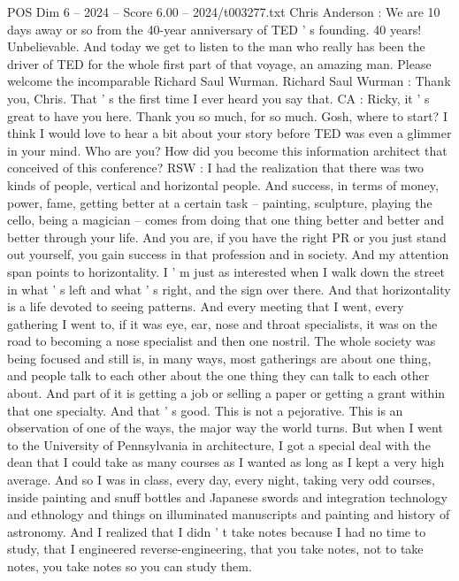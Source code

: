 \begin{textsample}{POS Dim 6 – 2024 – Score 6.00 – 2024/t003277.txt}  \label{ex:f6_pos_073}
Chris Anderson : We are 10 days away or so from the 40-year anniversary of TED ' s founding. 40 years!
Unbelievable.
And today we get to listen to the man who really has been the driver of TED for the whole first part of that voyage, an amazing man.
Please welcome the incomparable Richard Saul Wurman.
Richard Saul Wurman : Thank you, Chris.
That ' s the first time I ever heard you say that.
CA : Ricky, it ' s great to have you here.
Thank you so much, for so much.
Gosh, where to start?
I think I would love to hear a bit about your story before TED was even a glimmer in your mind.
Who are you?
How did you become this information architect that conceived of this conference?
RSW : I had the realization that there was two kinds of people, vertical and horizontal people.
And success, in terms of money, power, fame, getting better at a certain task -- painting, sculpture, playing the cello, being a magician -- comes from doing that one thing better and better and better through your life.
And you are, if you have the right PR or you just stand out yourself, you gain success in that profession and in society.
And my attention span points to horizontality.
I ' m just as interested when I walk down the street in what ' s left and what ' s right, and the sign over there.
And that horizontality is a life devoted to seeing patterns.
And every meeting that I went, every gathering I went to, if it was eye, ear, nose and throat specialists, it was on the road to becoming a nose specialist and then one nostril.
The whole society was being focused and still is, in many ways, most gatherings are about one thing, and people talk to each other about the one thing they can talk to each other about.
And part of it is getting a job or selling a paper or getting a grant within that one specialty.
And that ' s good.
This is not a pejorative.
This is an observation of one of the ways, the major way the world turns.
But when I went to the University of Pennsylvania in architecture, I got a special deal with the dean that I could take as many courses as I wanted as long as I kept a very high average.
And so I was in class, every day, every night, taking very odd courses, inside painting and snuff bottles and Japanese swords and integration technology and ethnology and things on illuminated manuscripts and painting and history of astronomy.
And I realized that I didn ' t take notes because I had no time to study, that I engineered reverse-engineering, that you take notes, not to take notes, you take notes so you can study them.

\end{textsample}
